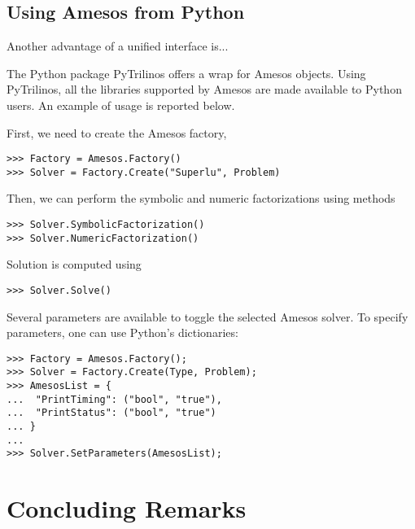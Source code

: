 \documentclass[acmtocl]{acmtrans2m}
\begin{document}
\subsection{Using Amesos from Python}
\label{sec:pytrilinos}

Another advantage of a unified interface is...

The Python package PyTrilinos
offers a wrap for Amesos objects. Using
PyTrilinos, all the libraries supported by Amesos are made available to Python
users. An example of usage is reported below.

First, we need to create the Amesos factory,
\begin{verbatim}
>>> Factory = Amesos.Factory()
>>> Solver = Factory.Create("Superlu", Problem)
\end{verbatim}
Then, we can perform the symbolic and numeric factorizations using methods
\begin{verbatim}
>>> Solver.SymbolicFactorization()
>>> Solver.NumericFactorization()
\end{verbatim}
Solution is computed using
\begin{verbatim}
>>> Solver.Solve()
\end{verbatim}

Several parameters are available to toggle the selected Amesos solver.
To specify parameters, one can use Python's dictionaries:
\begin{verbatim}
>>> Factory = Amesos.Factory();
>>> Solver = Factory.Create(Type, Problem);
>>> AmesosList = {
...  "PrintTiming": ("bool", "true"),
...  "PrintStatus": ("bool", "true")
... }
...
>>> Solver.SetParameters(AmesosList);
\end{verbatim}

\section{Concluding Remarks}
\label{sec:conclusions}
\end{document}
